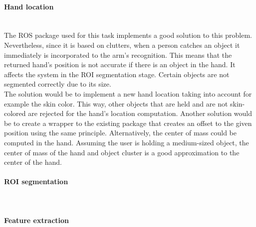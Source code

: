 	\paragraph{Hand location}\mbox{}\\

	The ROS package used for this task implements a good solution to this problem. 
	Nevertheless, since it is based on clutters, when a person catches an object it immediately is incorporated to the arm's recognition. 
	This means that the returned hand's position is not accurate if there is an object in the hand. 
	It affects the system in the ROI segmentation stage. 
	Certain objects are not segmented correctly due to its size.  
	\\

	The solution would be to implement a new hand location taking into account for example the skin color. 
	This way, other objects that are held and are not skin-colored are rejected for the hand's location computation. 
	Another solution would be to create a wrapper to the existing package that creates an offset to the given position using the same principle. 
	Alternatively, the center of mass could be computed in the hand. 
	Assuming the user is holding a medium-sized object, the center of mass of the hand and object cluster is a good approximation to the center of the hand. 
	\\
	
	\paragraph{ROI segmentation}\mbox{}\\

	\paragraph{Feature extraction}\mbox{}\\

	\mbox{}\\

